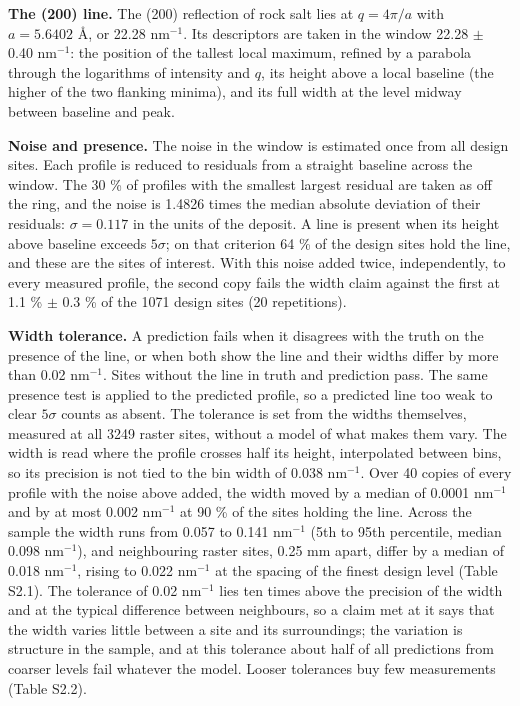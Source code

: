 \documentclass{iopjournal}
\begin{document}
\textbf{The (200) line.} The (200) reflection of rock salt lies at \(q = 4\pi / a\) with \(a = 5.6402\) \AA{}, or 22.28 nm\ensuremath{^{-1}}. Its descriptors are taken in the window 22.28 \ensuremath{\pm} 0.40 nm\ensuremath{^{-1}}: the position of the tallest local maximum, refined by a parabola through the logarithms of intensity and \(q\), its height above a local baseline (the higher of the two flanking minima), and its full width at the level midway between baseline and peak.

\textbf{Noise and presence.} The noise in the window is estimated once from all design sites. Each profile is reduced to residuals from a straight baseline across the window. The 30 \% of profiles with the smallest largest residual are taken as off the ring, and the noise is 1.4826 times the median absolute deviation of their residuals: \(\sigma = 0.117\) in the units of the deposit. A line is present when its height above baseline exceeds \(5\sigma\); on that criterion 64 \% of the design sites hold the line, and these are the sites of interest. With this noise added twice, independently, to every measured profile, the second copy fails the width claim against the first at 1.1 \% \ensuremath{\pm} 0.3 \% of the 1071 design sites (20 repetitions).

\textbf{Width tolerance.} A prediction fails when it disagrees with the truth on the presence of the line, or when both show the line and their widths differ by more than 0.02 nm\ensuremath{^{-1}}. Sites without the line in truth and prediction pass. The same presence test is applied to the predicted profile, so a predicted line too weak to clear \(5\sigma\) counts as absent. The tolerance is set from the widths themselves, measured at all 3249 raster sites, without a model of what makes them vary. The width is read where the profile crosses half its height, interpolated between bins, so its precision is not tied to the bin width of 0.038 nm\ensuremath{^{-1}}. Over 40 copies of every profile with the noise above added, the width moved by a median of 0.0001 nm\ensuremath{^{-1}} and by at most 0.002 nm\ensuremath{^{-1}} at 90 \% of the sites holding the line. Across the sample the width runs from 0.057 to 0.141 nm\ensuremath{^{-1}} (5th to 95th percentile, median 0.098 nm\ensuremath{^{-1}}), and neighbouring raster sites, 0.25 mm apart, differ by a median of 0.018 nm\ensuremath{^{-1}}, rising to 0.022 nm\ensuremath{^{-1}} at the spacing of the finest design level (Table S2.1). The tolerance of 0.02 nm\ensuremath{^{-1}} lies ten times above the precision of the width and at the typical difference between neighbours, so a claim met at it says that the width varies little between a site and its surroundings; the variation is structure in the sample, and at this tolerance about half of all predictions from coarser levels fail whatever the model. Looser tolerances buy few measurements (Table S2.2).
\end{document}
